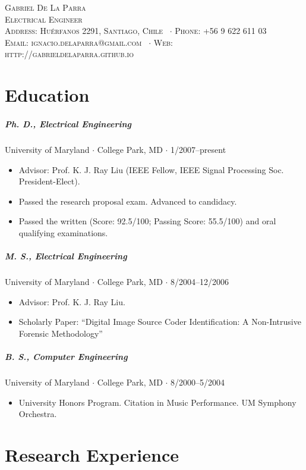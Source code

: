 \documentclass[10pt,letterpaper]{article}
\newcommand{\namestyle}{\Huge \scshape}
\newcommand{\deptstyle}{\footnotesize \rmfamily \scshape}
\newcommand{\addressstyle}{\color{addresscolor} \footnotesize \rmfamily \upshape}
\begin{document}
\begin{center}
\namestyle Gabriel De La Parra \\[0.3em]
\deptstyle Electrical Engineer \\[0.2em]
\addressstyle Address: Huérfanos 2291, Santiago, Chile \ $\cdot$ Phone: +56 9 622 611 03\\
Email: ignacio.delaparra@gmail.com \ $\cdot$ Web: http://gabrieldelaparra.github.io
\end{center}

\small

\section*{Education}

\subparagraph{Ph. D., Electrical Engineering}
University of Maryland $\cdot$ College Park, MD $\cdot$ 1/2007--present
\begin{itemize}
	\item Advisor: Prof. K. J. Ray Liu (IEEE Fellow, IEEE Signal Processing Soc. President-Elect).
	\item Passed the research proposal exam. Advanced to candidacy.
	\item Passed the written (Score: 92.5/100; Passing Score: 55.5/100) and oral qualifying examinations.
\end{itemize}

\subparagraph{M. S., Electrical Engineering}
University of Maryland $\cdot$ College Park, MD $\cdot$ 8/2004--12/2006
\begin{itemize}
	\item Advisor: Prof. K. J. Ray Liu.
	\item Scholarly Paper: ``Digital Image Source Coder Identification: A Non-Intrusive Forensic Methodology''
\end{itemize}

\subparagraph{B. S., Computer Engineering}
University of Maryland $\cdot$ College Park, MD $\cdot$ 8/2000--5/2004
\begin{itemize}
	\item University Honors Program.  Citation in Music Performance.  UM Symphony Orchestra.
\end{itemize}


\section*{Research Experience}
\end{document}
